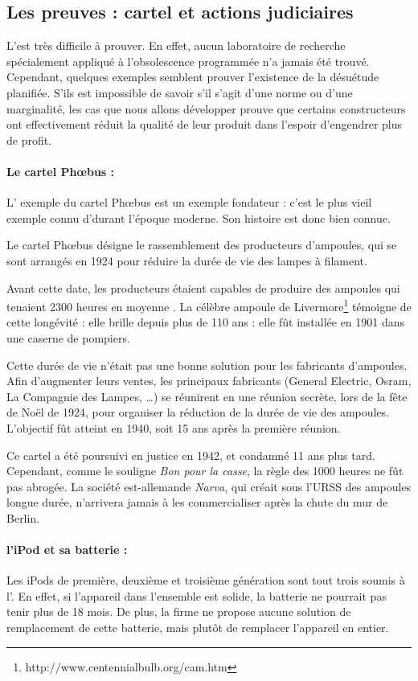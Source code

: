 \subsection{Les preuves : cartel et actions judiciaires}
\label{c1/s1/ss1:preuve_op}

L'\op est très difficile à prouver. En effet, aucun laboratoire de recherche spécialement appliqué à l'obsolescence programmée n'a jamais été trouvé. Cependant, quelques exemples semblent prouver l'existence de la désuétude planifiée. S'ils est impossible de savoir s'il s'agit d'une norme ou d'une marginalité, les cas que nous allons développer prouve que certains constructeurs ont effectivement réduit la qualité de leur produit dans l'espoir d'engendrer plus de profit. 

\paragraph*{Le cartel Phœbus : } L' exemple du cartel Phœbus est un exemple fondateur : c'est le plus vieil exemple connu d'\op durant l'époque moderne. Son histoire est donc bien connue. 

Le cartel Phœbus désigne le rassemblement des producteurs d'ampoules, qui se sont arrangés en 1924 pour réduire la durée de vie des lampes à filament. 

Avant cette date, les producteurs étaient capables de produire des ampoules qui tenaient 2300 heures en moyenne \cite{opes_PHOEBUS}. La célèbre ampoule de Livermore\footnote{http://www.centennialbulb.org/cam.htm} témoigne de cette longévité : elle brille depuis plus de 110 ans : elle fût installée en 1901 dans une caserne de pompiers. 

Cette durée de vie n'était pas une bonne solution pour les fabricants d'ampoules. Afin d'augmenter leurs ventes, les principaux fabricants (General Electric, Osram, La Compagnie des Lampes, \dots) se réunirent en une réunion secrète, lors de la fête de Noël de 1924, pour organiser la  réduction de la durée de vie des ampoules. L'objectif fût atteint  en 1940, soit 15 ans après la première réunion. 

Ce cartel a été poursuivi en justice en 1942, et condamné 11 ans plus tard. Cependant, comme le souligne \textit{Bon pour la casse}, la règle des 1000 heures ne fût pas abrogée. La société est-allemande \textit{Narva}, qui créait sous l'URSS des ampoules longue durée, n'arrivera jamais à les commercialiser après la chute du mur de Berlin. 

\paragraph*{l'iPod et sa batterie : } Les iPods de première, deuxième et troisième génération sont tout trois soumis à l'\op. En effet, si l'appareil dans l'ensemble est solide, la batterie ne pourrait pas tenir plus de 18 mois\cite{cec-zevRapportObsProg}. De plus, la firme ne propose aucune solution de remplacement de cette batterie, mais plutôt de remplacer l'appareil en entier. 

